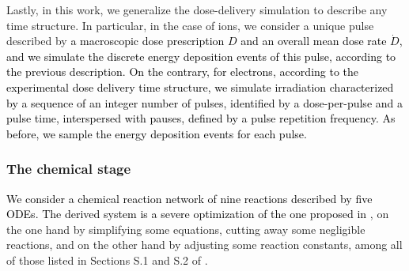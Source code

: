 \documentclass[10pt]{iopart}
\newcommand{\marco}[1]{\textcolor{black}{#1}}
\newcommand{\fra}[1]{\textcolor{black}{#1}}
\numberwithin{table}{section}
\begin{document}
Lastly, in this work, we generalize the dose-delivery simulation to describe any time structure. In particular, in the case of ions, we consider a unique pulse described by \marco{a macroscopic dose prescription $D$ and an overall mean dose rate $\dot{D}$, and we simulate the discrete energy deposition events of this pulse, according to the previous description. On the contrary, for electrons, according to the experimental dose delivery time structure, we simulate irradiation characterized by a sequence of an integer number of pulses, identified by a dose-per-pulse and a pulse time, interspersed with pauses, defined by a pulse repetition frequency. As before, we sample the energy deposition events for each pulse.}

\subsubsection*{The chemical stage}

\fra{We consider a chemical reaction network of nine reactions described by five ODEs. The derived system is a severe optimization of the one proposed in} \cite{Labarbe2020}, on the one hand by simplifying some equations, cutting away some negligible reactions, and on the other hand by adjusting some reaction constants, among all of those listed in Sections S.1 and S.2 of \cite{Labarbe2020}.
\end{document}
